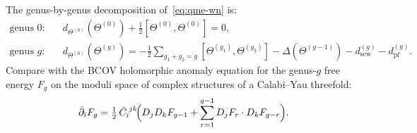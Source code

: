 \documentclass[11pt]{article}
\begin{document}
The genus-by-genus decomposition of~\eqref{eq:qme-wn} is:
\begin{align}
\text{genus $0$:} &\quad
  d_{\Theta^{(0)}}(\Theta^{(0)})
  + \tfrac{1}{2}[\Theta^{(0)}, \Theta^{(0)}] = 0,
  \label{eq:mc-genus0}\\[4pt]
\text{genus $g$:} &\quad
  d_{\Theta^{(0)}}(\Theta^{(g)})
  = -\tfrac{1}{2}\!\sum_{g_1+g_2=g}
    [\Theta^{(g_1)}, \Theta^{(g_2)}]
  - \Delta(\Theta^{(g-1)})
  - d_{\mathrm{sew}}^{(g)} - d_{\mathrm{pf}}^{(g)}.
  \label{eq:mc-genusg}
\end{align}
Compare with the BCOV holomorphic anomaly equation for the genus-$g$
free energy $F_g$ on the moduli space of complex structures of a
Calabi--Yau threefold:
\[
\bar\partial_{\bar\imath} F_g
= \tfrac{1}{2}\, \bar{C}_{\bar\imath}^{\;jk}\!\Bigl(
  D_j D_k F_{g-1}
  + \sum_{r=1}^{g-1} D_j F_r \cdot D_k F_{g-r}
  \Bigr).
\]
\end{document}
